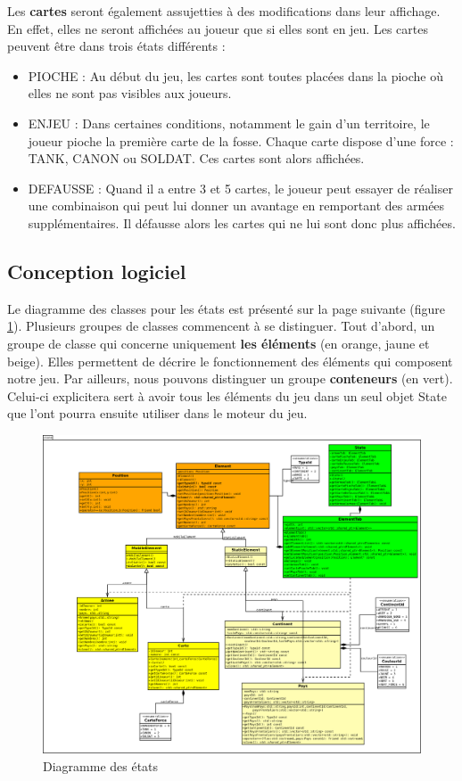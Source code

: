 \vspace{0.8cm}
Les \textbf{cartes} seront également assujetties à des modifications dans leur affichage. En effet, elles ne seront affichées au joueur que si elles sont en jeu. Les cartes peuvent être dans trois états différents :
\newline 

\begin{itemize}
    \item PIOCHE : Au début du jeu, les cartes sont toutes placées dans la pioche où elles ne sont pas visibles aux joueurs.
    \item ENJEU : Dans certaines conditions, notamment le gain d'un territoire, le joueur pioche la première carte de la fosse. Chaque carte dispose d'une force : TANK, CANON ou SOLDAT. Ces cartes sont alors affichées.
    \item DEFAUSSE :  Quand il a entre 3 et 5 cartes, le joueur peut essayer de réaliser une combinaison qui peut lui donner un avantage en remportant des armées supplémentaires. Il défausse alors les cartes qui ne lui sont donc plus affichées.
\end{itemize}

\subsection{Conception logiciel}
Le diagramme des classes pour les états est présenté sur la page suivante (figure \ref{fig:state}). Plusieurs groupes de classes commencent à se distinguer. 
Tout d'abord, un groupe de classe qui concerne uniquement \textbf{les éléments} (en orange, jaune et beige). Elles permettent de décrire le fonctionnement des éléments qui composent notre jeu. 
\newline 
\newline 
Par ailleurs, nous pouvons distinguer un groupe \textbf{conteneurs} (en vert). Celui-ci explicitera sert à avoir tous les éléments du jeu dans un seul objet State que l'ont pourra ensuite utiliser dans le moteur du jeu.

\newpage

\begin{landscape}
    \begin{figure}[!htbp]
        \centering
        \includegraphics[width=21cm]{Images/state.png}
        \caption{Diagramme des états}
        \label{fig:state}
    \end{figure}
\end{landscape}